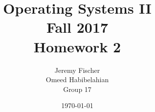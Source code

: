 \documentclass[draftclsnofoot, onecolumn, 10pt, compsoc]{IEEEtran}
\title{\textbf{Operating Systems II}\\Fall 2017\\Homework 2}
\author {Jeremy Fischer\\Omeed Habibelahian\\Group 17}
\date{\today}
\begin{document}
	\maketitle
	\begin{abstract}
	\end{abstract}
	\newpage
	
	
	
	
\end{document}
